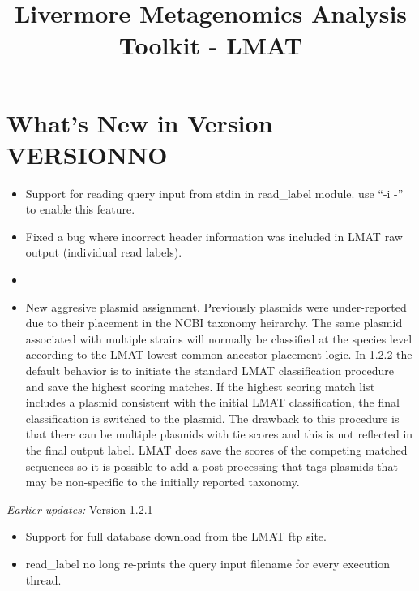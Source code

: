 \documentclass[11pt]{article}
\title{Livermore Metagenomics Analysis Toolkit - LMAT}
\newcommand{\lmatver}{VERSIONNO}
\begin{document}
\maketitle
\tableofcontents

\section{What's New in Version \lmatver}
\begin{itemize}
\item
Support for reading query input from stdin in read\_label module.  use ``-i -'' to enable this feature.
\item
Fixed a bug where incorrect header information was included in LMAT raw output (individual read labels).
\item
\item New aggresive plasmid assignment.  Previously plasmids were under-reported due to their placement in the NCBI taxonomy heirarchy. The same plasmid associated with multiple strains will normally be classified at the species level according to the LMAT lowest common ancestor placement logic. In 1.2.2 the default behavior is to initiate the standard LMAT classification procedure and save the highest scoring matches.  If the highest scoring match list includes a plasmid consistent with the initial LMAT classification, the final classification is switched to the plasmid.  The drawback
to this procedure is that there can be multiple plasmids with tie scores and this is not reflected in the final output label. LMAT does save the scores of the competing matched sequences so it is possible to add a post processing that tags plasmids that may be non-specific to the initially reported taxonomy. 

\end{itemize}

{\it Earlier updates:}
Version 1.2.1
\begin{itemize}
\item
Support for full database download from the LMAT ftp site.
\item
read\_label no long re-prints the query input filename for every execution thread.
\end{itemize}
\end{document}
